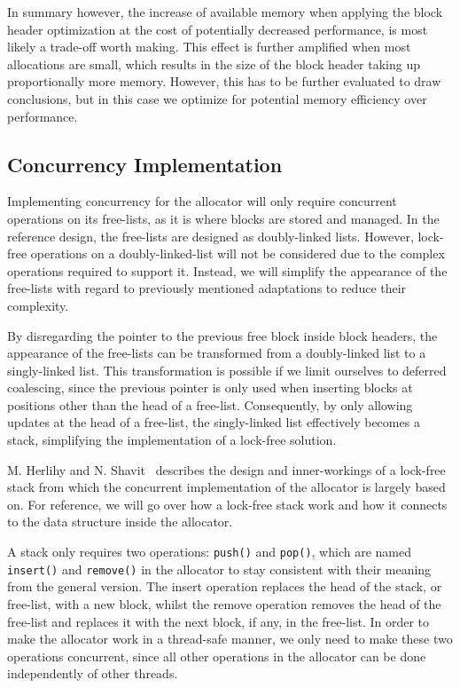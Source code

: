 In summary however, the increase of available memory when applying the block header optimization at the cost of potentially decreased performance, is most likely a trade-off worth making. This effect is further amplified when most allocations are small, which results in the size of the block header taking up proportionally more memory. However, this has to be further evaluated to draw conclusions, but in this case we optimize for potential memory efficiency over performance.

\subsection{Concurrency Implementation}
\label{sec:adaptations_impl:concurrency}

Implementing concurrency for the allocator will only require concurrent operations on its free-lists, as it is where blocks are stored and managed. In the reference design, the free-lists are designed as doubly-linked lists. However, lock-free operations on a doubly-linked-list will not be considered due to the complex operations required to support it. Instead, we will simplify the appearance of the free-lists with regard to previously mentioned adaptations to reduce their complexity.

By disregarding the pointer to the previous free block inside block headers, the appearance of the free-lists can be transformed from a doubly-linked list to a singly-linked list. This transformation is possible if we limit ourselves to deferred coalescing, since the previous pointer is only used when inserting blocks at positions other than the head of a free-list. Consequently, by only allowing updates at the head of a free-list, the singly-linked list effectively becomes a stack, simplifying the implementation of a lock-free solution.

M. Herlihy and N. Shavit~\cite[Chapter 11]{artofmpprogramming} describes the design and inner-workings of a lock-free stack from which the concurrent implementation of the allocator is largely based on. For reference, we will go over how a lock-free stack work and how it connects to the data structure inside the allocator.

A stack only requires two operations: \texttt{push()} and \texttt{pop()}, which are named \texttt{insert()} and \texttt{remove()} in the allocator to stay consistent with their meaning from the general version. The insert operation replaces the head of the stack, or free-list, with a new block, whilst the remove operation removes the head of the free-list and replaces it with the next block, if any, in the free-list. In order to make the allocator work in a thread-safe manner, we only need to make these two operations concurrent, since all other operations in the allocator can be done independently of other threads.

